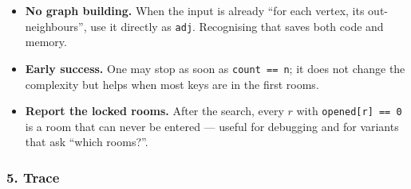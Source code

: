 \begin{tricksbox}
\begin{itemize}[leftmargin=*]
    \item \textbf{No graph building.} When the input is already ``for each vertex, its out-neighbours'', use it directly as \texttt{adj}. Recognising that saves both code and memory.
    \item \textbf{Early success.} One may stop as soon as \texttt{count == n}; it does not change the complexity but helps when most keys are in the first rooms.
    \item \textbf{Report the locked rooms.} After the search, every $r$ with \texttt{opened[r] == 0} is a room that can never be entered --- useful for debugging and for variants that ask ``which rooms?''.
\end{itemize}
\end{tricksbox}

\subsubsection*{5. Trace}

